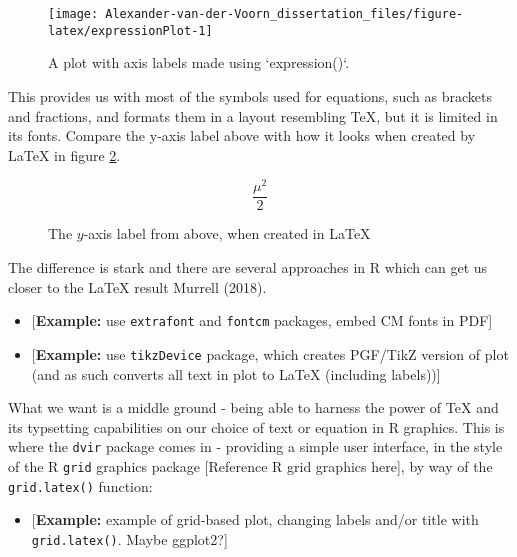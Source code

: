 \documentclass[]{article}
\providecommand{\tightlist}{%
  \setlength{\itemsep}{0pt}\setlength{\parskip}{0pt}}
\begin{document}
\begin{figure}

{\centering \texttt{[image: Alexander-van-der-Voorn\_dissertation\_files/figure-latex/expressionPlot-1]} 

}

\caption{A plot with axis labels made using `expression()`.}\label{fig:expressionPlot}
\end{figure}

This provides us with most of the symbols used for equations, such as
brackets and fractions, and formats them in a layout resembling \TeX{},
but it is limited in its fonts. Compare the y-axis label above with how
it looks when created by \LaTeX{} in figure \ref{muOver2}.

\begin{figure}\label{muOver2}
\begin{equation*}
\dfrac{\mu^2}{2}
\end{equation*}
\caption{The \(y\)-axis label from above, when created in \LaTeX}
\end{figure}

The difference is stark and there are several approaches in R which can
get us closer to the \LaTeX{} result Murrell (2018).

\begin{itemize}
\item
  {[}\textbf{Example:} use \texttt{extrafont} and \texttt{fontcm}
  packages, embed CM fonts in PDF{]}
\item
  {[}\textbf{Example:} use \texttt{tikzDevice} package, which creates
  PGF/TikZ version of plot (and as such converts all text in plot to
  LaTeX (including labels)){]}
\end{itemize}

What we want is a middle ground - being able to harness the power of
\TeX{} and its typsetting capabilities on our choice of text or equation
in R graphics. This is where the \texttt{dvir} package comes in -
providing a simple user interface, in the style of the R \texttt{grid}
graphics package {[}Reference R grid graphics here{]}, by way of the
\texttt{grid.latex()} function:

\begin{itemize}
\tightlist
\item
  {[}\textbf{Example:} example of grid-based plot, changing labels
  and/or title with \texttt{grid.latex()}. Maybe ggplot2?{]}
\end{itemize}
\end{document}
